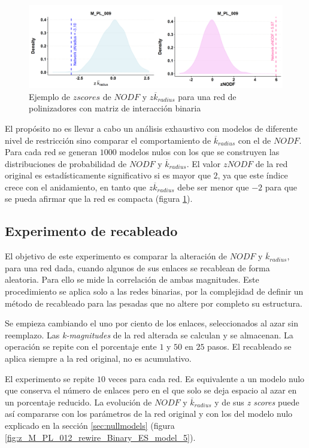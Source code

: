 \begin{figure}[hp!]
\centering
\includegraphics[scale=0.5]{Figures/ESTATICA_zALL.png}
\caption{Ejemplo de $z scores$ de $NODF$ y $z\overline k_{radius}$ para una red de polinizadores con matriz de interacción binaria \cite{elberling1999structure} }
\label{fig:ESTATICA_zALL}
\end{figure}

El propósito no es llevar a cabo un análisis exhaustivo con modelos de diferente nivel de restricción sino comparar el comportamiento de $\overline k_{radius}$ con el de $NODF$. Para
cada red se generan $1000$ modelos nulos con los que se construyen las distribuciones de probabilidad de $NODF$ y $\overline k_{radius}$. El valor $zNODF$ de la red original es estadísticamente significativo si es mayor que $2$, ya que este índice crece con el anidamiento, en tanto que $z\overline k_{radius}$ debe ser menor que $-2$ para que se pueda afirmar que la red es compacta (figura \ref{fig:ESTATICA_zALL}).

\subsection{Experimento de recableado}

El objetivo de este experimento es comparar la alteración de $NODF$ y $\overline k_{radius}$, para una red dada, cuando algunos de sus enlaces se recablean de forma aleatoria. Para ello se mide la correlación de ambas magnitudes. Este procedimiento se aplica solo a las redes binarias, por la complejidad de definir un método de recableado para las pesadas que no altere por completo su estructura.

Se empieza cambiando el uno por ciento de los enlaces, seleccionados al azar sin reemplazo. Las \textit{k-magnitudes} de la red alterada se calculan y se almacenan. La operación se repite con el porcentaje ente $1$ y $50$ en $25$ pasos. El recableado se aplica siempre a la red original, no es acumulativo. 

El experimento se repite $10$ veces para cada red. Es equivalente a un modelo nulo que conserva el número de enlaces pero en el que solo se deja espacio al azar en un porcentaje reducido. La evolución de $NODF$ y $\overline k_{radius}$ y de sus \textit{z scores} puede así compararse con los parámetros de la red original y con los del modelo nulo explicado en la sección \ref{sec:nullmodels} (figura \ref{fig:z_M_PL_012_rewire_Binary_ES_model_5}).

